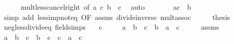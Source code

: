 \begin{isabellebody}
\ \ \ \ \isamarkupfalse%
\ mult{\isacharunderscore}{\kern0pt}less{\isacharunderscore}{\kern0pt}cancel{\isacharunderscore}{\kern0pt}right\ {\isacharbrackleft}{\kern0pt}of\ a\ c\ {\isachardoublequoteopen}b\ {\isacharslash}{\kern0pt}\ c{\isachardoublequoteclose}{\isacharbrackright}{\kern0pt}\ \isamarkupfalse%
\ auto\isanewline
\ \ \isamarkupfalse%
\ \isamarkupfalse%
\ {\isachardoublequoteopen}{\isachardot}{\kern0pt}{\isachardot}{\kern0pt}{\isachardot}{\kern0pt}\ {\isacharequal}{\kern0pt}\ {\isacharparenleft}{\kern0pt}a{\isacharasterisk}{\kern0pt}c\ {\isacharless}{\kern0pt}\ b{\isacharparenright}{\kern0pt}{\isachardoublequoteclose}\isanewline
\ \ \ \ \isamarkupfalse%
\ {\isacharparenleft}{\kern0pt}simp\ add{\isacharcolon}{\kern0pt}\ less{\isacharunderscore}{\kern0pt}imp{\isacharunderscore}{\kern0pt}not{\isacharunderscore}{\kern0pt}eq{}\ {\isacharbrackleft}{\kern0pt}OF\ assms{\isacharbrackright}{\kern0pt}\ divide{\isacharunderscore}{\kern0pt}inverse\ mult{\isachardot}{\kern0pt}assoc{\isacharparenright}{\kern0pt}\isanewline
\ \ \isamarkupfalse%
\ \isamarkupfalse%
\ {\isacharquery}{\kern0pt}thesis\ \isacommand{{\isachardot}{\kern0pt}}\isamarkupfalse%
\isanewline
{}\isamarkupfalse%
%
\endisatagproof
{\isafoldproof}%
%
\isadelimproof
\isanewline
%
\endisadelimproof
\isanewline
{}\isamarkupfalse%
\ neg{\isacharunderscore}{\kern0pt}less{\isacharunderscore}{\kern0pt}divide{\isacharunderscore}{\kern0pt}eq\ {\isacharbrackleft}{\kern0pt}field{\isacharunderscore}{\kern0pt}simps{\isacharbrackright}{\kern0pt}{\isacharcolon}{\kern0pt}\isanewline
\ \ \ {\isachardoublequoteopen}c\ {\isacharless}{\kern0pt}\ {}{\isachardoublequoteclose}\isanewline
\ \ \ {\isachardoublequoteopen}a\ {\isacharless}{\kern0pt}\ b\ {\isacharslash}{\kern0pt}\ c\ {\isasymlongleftrightarrow}\ b\ {\isacharless}{\kern0pt}\ a\ {\isacharasterisk}{\kern0pt}\ c{\isachardoublequoteclose}\isanewline
%
\isadelimproof
%
\endisadelimproof
%
\isatagproof
{}\isamarkupfalse%
\ {\isacharminus}{\kern0pt}\isanewline
\ \ \isamarkupfalse%
\ assms\ \isamarkupfalse%
\ {\isachardoublequoteopen}a\ {\isacharless}{\kern0pt}\ b\ {\isacharslash}{\kern0pt}\ c\ {\isasymlongleftrightarrow}\ {\isacharparenleft}{\kern0pt}b\ {\isacharslash}{\kern0pt}\ c{\isacharparenright}{\kern0pt}\ {\isacharasterisk}{\kern0pt}\ c\ {\isacharless}{\kern0pt}\ a\ {\isacharasterisk}{\kern0pt}\ c{\isachardoublequoteclose}\isanewline

\end{isabellebody}
